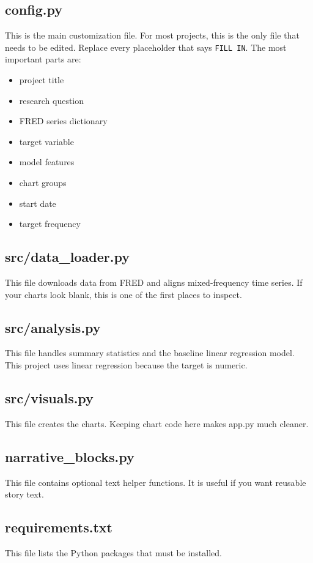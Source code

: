 \documentclass[11pt]{article}
\begin{document}
\subsection{config.py}
This is the main customization file. For most projects, this is the only file that needs to be edited.
Replace every placeholder that says \texttt{FILL IN}. The most important parts are:
\begin{itemize}[leftmargin=1.5em]
  \item project title
  \item research question
  \item FRED series dictionary
  \item target variable
  \item model features
  \item chart groups
  \item start date
  \item target frequency
\end{itemize}

\subsection{src/data_loader.py}
This file downloads data from FRED and aligns mixed-frequency time series.
If your charts look blank, this is one of the first places to inspect.

\subsection{src/analysis.py}
This file handles summary statistics and the baseline linear regression model.
This project uses linear regression because the target is numeric.

\subsection{src/visuals.py}
This file creates the charts. Keeping chart code here makes app.py much cleaner.

\subsection{narrative\_blocks.py}
This file contains optional text helper functions. It is useful if you want reusable story text.

\subsection{requirements.txt}
This file lists the Python packages that must be installed.
\end{document}
